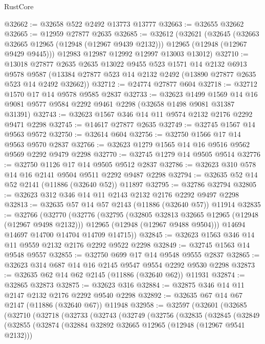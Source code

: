 \begin{lexlean}{RustCore}
\begin{coremodule}
@32662 := @32658 @522 @2492 @13773 @13777
@32663 := @32655 @32662
@32665 := @12959 @27877 @2635
@32685 := @32612
    (@32621
      (@32645
        (@32663 @32665 @12965 (@12948 (@12967 @9439 @2132)))
        @12965
        (@12948 (@12967 @9429 @9445)))
      @12983
      @12987
      @12992
      @12997
      @13003
      @13012)
@32710 := @13018
    @27877
    @2635
    @2635
    @13022
    @9455
    @523
    @1571
    @14
    @2132
    @6913
    @9578
    @9587
    (@13384 @27877 @523 @14 @2132 @2492 (@13890 @27877 @2635 @523 @14 @2492 @32662))
@32712 := @24774 @27877 @604
@32718 := @32712 @1570 @17 @14 @9578 @9585 @2837
@32733 := @32623
    @1499
    @1569
    @14
    @16
    @9081
    @9577
    @9584
    @2292
    @9461
    @2298
    (@32658 @1498 @9081 @31387 @31391)
@32743 := @32623 @1567 @346 @14 @11 @9574 @2132 @2176 @2292 @9471 @2298
@32745 := @14617 @27877 @2635
@32749 := @32745 @1567 @14 @9563 @9572
@32750 := @32614 @604
@32756 := @32750 @1566 @17 @14 @9563 @9570 @2837
@32766 := @32623 @1279 @1565 @14 @16 @9516 @9562 @9569 @2292 @9479 @2298
@32770 := @32745 @1279 @14 @9505 @9514
@32776 := @32750 @1126 @17 @14 @9505 @9512 @2837
@32786 := @32623 @310 @578 @14 @16 @2141 @9504 @9511 @2292 @9487 @2298
@32794 := @32635 @52 @14 @52 @2141 (@11886 (@32640 @52)) @11897
@32795 := @32786 @32794
@32805 := @32623 @312 @346 @14 @11 @2143 @2132 @2176 @2292 @9497 @2298
@32813 := @32635 @57 @14 @57 @2143 (@11886 (@32640 @57)) @11914
@32835 := @32766
    (@32770
      (@32776
        (@32795
          (@32805 @32813 @32665 @12965 (@12948 (@12967 @9498 @2132)))
          @12965
          (@12948 (@12967 @9488 @9504)))
        @14694
        @14697
        @14700
        @14704
        @14709
        @14715))
@32845 := @32623 @1563 @346 @14 @11 @9559 @2132 @2176 @2292 @9522 @2298
@32849 := @32745 @1563 @14 @9548 @9557
@32855 := @32750 @699 @17 @14 @9548 @9555 @2837
@32865 := @32623 @314 @687 @14 @16 @2145 @9547 @9554 @2292 @9530 @2298
@32873 := @32635 @62 @14 @62 @2145 (@11886 (@32640 @62)) @11931
@32874 := @32865 @32873
@32875 := @32623 @316
@32884 := @32875 @346 @14 @11 @2147 @2132 @2176 @2292 @9540 @2298
@32892 := @32635 @67 @14 @67 @2147 (@11886 (@32640 @67)) @11948
@32958 := @32597
    (@32601
      (@32685
        (@32710
          (@32718
            (@32733
              (@32743
                (@32749
                  (@32756
                    (@32835
                      (@32845
                        (@32849
                          (@32855
                            (@32874
                              (@32884 @32892 @32665 @12965 (@12948 (@12967 @9541 @2132)))

\end{coremodule}
\end{lexlean}
